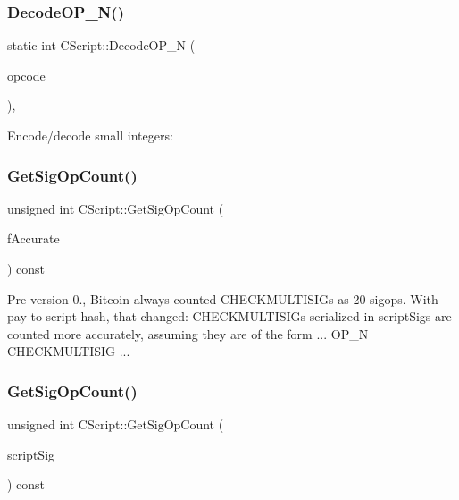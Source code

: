 \subsubsection{\texorpdfstring{DecodeOP\_N()}{DecodeOP\_N()}}
{\footnotesize\ttfamily static int C\+Script\+::\+Decode\+O\+P\+\_\+N (\begin{DoxyParamCaption}\item[{opcodetype}]{opcode }\end{DoxyParamCaption})\hspace{0.3cm}{\ttfamily [inline]}, {\ttfamily [static]}}

Encode/decode small integers\+: \mbox{\label{class_c_script_a957f92ddf3efcd76b66e514c05f27dde}} 
\subsubsection{\texorpdfstring{GetSigOpCount()}{GetSigOpCount()}\hspace{0.1cm}{\footnotesize\ttfamily [1/2]}}
{\footnotesize\ttfamily unsigned int C\+Script\+::\+Get\+Sig\+Op\+Count (\begin{DoxyParamCaption}\item[{bool}]{f\+Accurate }\end{DoxyParamCaption}) const}

Pre-\/version-\/0., Bitcoin always counted C\+H\+E\+C\+K\+M\+U\+L\+T\+I\+S\+I\+Gs as 20 sigops. With pay-\/to-\/script-\/hash, that changed\+: C\+H\+E\+C\+K\+M\+U\+L\+T\+I\+S\+I\+Gs serialized in script\+Sigs are counted more accurately, assuming they are of the form ... O\+P\+\_\+N C\+H\+E\+C\+K\+M\+U\+L\+T\+I\+S\+IG ... \mbox{\label{class_c_script_ab2fc38465955bb6688d204036633ee85}} 
\subsubsection{\texorpdfstring{GetSigOpCount()}{GetSigOpCount()}\hspace{0.1cm}{\footnotesize\ttfamily [2/2]}}
{\footnotesize\ttfamily unsigned int C\+Script\+::\+Get\+Sig\+Op\+Count (\begin{DoxyParamCaption}\item[{const \mbox{\hyperlink{class_c_script}{C\+Script}} \&}]{script\+Sig }\end{DoxyParamCaption}) const}


